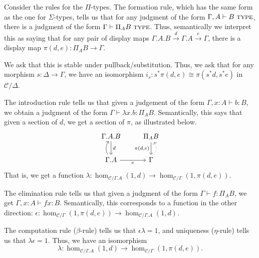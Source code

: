 \documentclass{article}
\theoremstyle{definition}
\newcommand{\type}{\ \textsc{type}}
\newcommand{\C}{\mathcal C}
\begin{document}
Consider the rules for the $\Pi$-types. The formation rule, which has the same form as the one for $\Sigma$-types, tells us that for any judgment of the form $\Gamma, A \vdash B \type$, there is a judgment of the form $\Gamma \vdash \Pi_A B \type$. Thus, semantically we interpret this as saying that for any pair of display maps $\Gamma.A . B \xrightarrow{d} \Gamma. A  \xrightarrow{e} \Gamma$, there is a display map $\pi(d,e) : \Pi_A B \to \Gamma$.

We ask that this is stable under pullback/substitution. Thus, we ask that for any morphism $s : \Delta \to \Gamma$, we have an isomorphism $i_s: s^* \pi(d,e) \cong \pi(s^*d, s^*e)$ in $\C / \Delta$.

The introduction rule tells us that given a judgement of the form $\Gamma, x: A \vdash b : B$, we obtain a judgment of the form $\Gamma \vdash \lambda x . b: \Pi_A B $. Semantically, this says that given a section of $d$, we get a section of $\pi$, as illustrated below.
\[
     \begin{tikzcd}
         \Gamma.A.B \ar[d,"d"] & \Pi_A B \ar[d,"{\pi(d,e)}"']
         \\ 
         \Gamma.A \ar[r,"e"'] \ar[u,bend left]& \Gamma \ar[u, bend right, dotted]
     \end{tikzcd}
\]
That is, we get a function $\lambda : \hom_{\C / \Gamma . A} (1, d) \to \hom_{\C / \Gamma} (1 , {\pi(d,e)})$.

The elimination rule tells us that given a judgment of the form $\Gamma \vdash f : \Pi_A B$, we get $\Gamma, x : A \vdash f x : B $. Semantically, this corresponds to a function in the other direction: $\epsilon : \hom_{\C / \Gamma} (1 , {\pi(d,e)}) \to \hom_{\C / \Gamma . A} (1, d)$.

The computation rule ($\beta$-rule) tells us that $\epsilon \lambda = 1$, and uniqueness ($\eta$-rule) tells us that $\lambda \epsilon = 1$. Thus, we have an isomorphism 
\[ \lambda : \hom_{\C / \Gamma . A} (1, d) \to \hom_{\C / \Gamma} (1 , {\pi(d,e)}).\]
\end{document}
